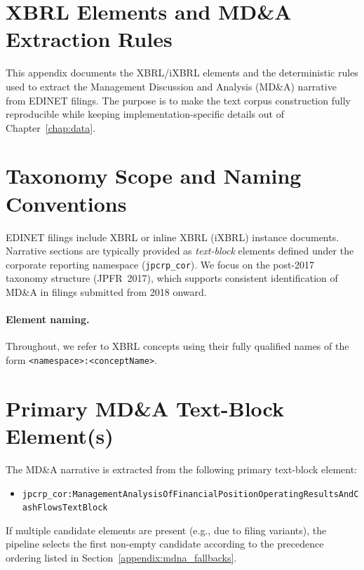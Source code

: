 \section{XBRL Elements and MD\&A Extraction Rules}
\label{appendix:xbrl_mdna_extraction}

This appendix documents the XBRL/iXBRL elements and the deterministic rules used to extract the Management Discussion and Analysis (MD\&A) narrative from EDINET filings. The purpose is to make the text corpus construction fully reproducible while keeping implementation-specific details out of Chapter~\ref{chap:data}.

\section{Taxonomy Scope and Naming Conventions}
\label{appendix:taxonomy_scope}

EDINET filings include XBRL or inline XBRL (iXBRL) instance documents. Narrative sections are typically provided as \emph{text-block} elements defined under the corporate reporting namespace (\texttt{jpcrp\_cor}). We focus on the post-2017 taxonomy structure (JPFR~2017), which supports consistent identification of MD\&A in filings submitted from 2018 onward.

\paragraph{Element naming.}
Throughout, we refer to XBRL concepts using their fully qualified names of the form \texttt{<namespace>:<conceptName>}.

\section{Primary MD\&A Text-Block Element(s)}
\label{appendix:mdna_primary_element}

The MD\&A narrative is extracted from the following primary text-block element:

\begin{itemize}
  \item \texttt{jpcrp\_cor:ManagementAnalysisOfFinancialPositionOperatingResultsAndCashFlowsTextBlock}
\end{itemize}

\noindent If multiple candidate elements are present (e.g., due to filing variants), the pipeline selects the first non-empty candidate according to the precedence ordering listed in Section~\ref{appendix:mdna_fallbacks}.

